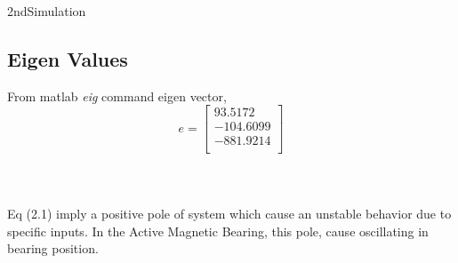 \documentclass{article}
\begin{document}
\begin{homeworkProblem}{2nd}{Simulation}
\addtocounter{section}{1}
\setcounter{subsection}{0}
\setcounter{equation}{0}


\subsection{Eigen Values}
From matlab \textit{eig} command eigen vector,\\
  \begin{equation}
    e =
    \begin{bmatrix}
       93.5172\\
     -104.6099\\
     -881.9214\\
    \end{bmatrix}
  \end{equation}
\\~\\
\\Eq (2.1) imply a positive pole of system which cause an unstable behavior due to specific inputs. In the Active Magnetic Bearing, this pole, cause oscillating in bearing position.


\end{homeworkProblem}
\end{document}

